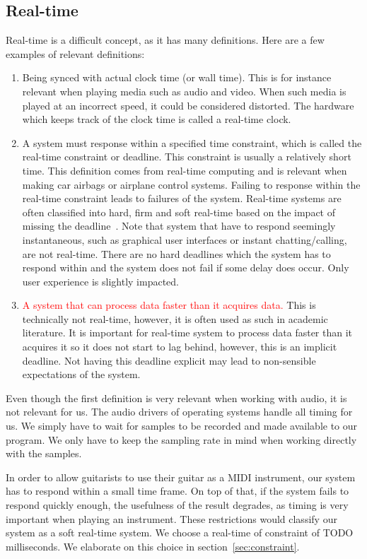 \documentclass[10pt,twocolumn]{article}
\begin{document}
\subsection{Real-time}
Real-time is a difficult concept, as it has many definitions. Here are a few examples of relevant definitions:
\begin{enumerate}
    \item Being synced with actual clock time (or wall time). This is for instance relevant when playing media such as audio and video. When such media is played at an incorrect speed, it could be considered distorted. The hardware which keeps track of the clock time is called a real-time clock.
    \item A system must response within a specified time constraint, which is called the real-time constraint or deadline. This constraint is usually a relatively short time. This definition comes from real-time computing and is relevant when making car airbags or airplane control systems. Failing to response within the real-time constraint leads to failures of the system. Real-time systems are often classified into hard, firm and soft real-time based on the impact of missing the deadline~\cite{realclass}. Note that system that have to respond seemingly instantaneous, such as graphical user interfaces or instant chatting/calling, are not real-time. There are no hard deadlines which the system has to respond within and the system does not fail if some delay does occur. Only user experience is slightly impacted.
    \item \textcolor{red}{A system that can process data faster than it acquires data.} This is technically not real-time, however, it is often used as such in academic literature. It is important for real-time system to process data faster than it acquires it so it does not start to lag behind, however, this is an implicit deadline. Not having this deadline explicit may lead to non-sensible expectations of the system.
\end{enumerate}
Even though the first definition is very relevant when working with audio, it is not relevant for us. The audio drivers of operating systems handle all timing for us. We simply have to wait for samples to be recorded and made available to our program. We only have to keep the sampling rate in mind when working directly with the samples.

In order to allow guitarists to use their guitar as a MIDI instrument, our system has to respond within a small time frame. On top of that, if the system fails to respond quickly enough, the usefulness of the result degrades, as timing is very important when playing an instrument. These restrictions would classify our system as a soft real-time system. We choose a real-time of constraint of TODO milliseconds. We elaborate on this choice in section~\ref{sec:constraint}.
\end{document}
